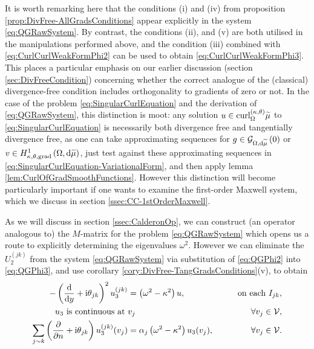 It is worth remarking here that the conditions (i) and (iv) from proposition \ref{prop:DivFree-AllGradsConditions} appear explicitly in the system \eqref{eq:QGRawSystem}.
By contrast, the conditions (ii), and (v) are both utilised in the manipulations performed above, and the condition (iii) combined with \eqref{eq:CurlCurlWeakFormPhi2} can be used to obtain \eqref{eq:CurlCurlWeakFormPhi3}.
This places a particular emphasis on our earlier discussion (section \ref{sec:DivFreeCondition}) concerning whether the correct analogue of the (classical) divergence-free condition includes orthogonality to gradients of zero or not.
In the case of the problem \eqref{eq:SingularCurlEquation} and the derivation of \eqref{eq:QGRawSystem}, this distinction is moot: any solution $u\in\mathrm{curl}_{\Omega}^{\left( \kappa, \theta \right)}{\widetilde{\mu}}$ to \eqref{eq:SingularCurlEquation} is necessarily both divergence free and tangentially divergence free, as one can take approximating sequences for $g\in\mathcal{G}_{ \Omega, \mathrm{d}\widetilde{\mu}}\left( 0 \right)$ or $v\in H^1_{\kappa,\theta,\mathrm{grad}}\left( \Omega, \mathrm{d}\widetilde{\mu} \right)$, just test against these approximating sequences in \eqref{eq:SingularCurlEquation-VariationalForm}, and then apply lemma \ref{lem:CurlOfGradSmoothFunctions}.
However this distinction will become particularly important if one wants to examine the first-order Maxwell system, which we discuss in section \ref{ssec:CC-1stOrderMaxwell}.

As we will discuss in section \ref{ssec:CalderonOp}, we can construct (an operator analogous to) the $M$-matrix for the problem \eqref{eq:QGRawSystem} which opens us a route to explicitly determining the eigenvalues $\omega^2$.
However we can eliminate the $U_2^{(jk)}$ from the system \eqref{eq:QGRawSystem} via substitution of \eqref{eq:QGPhi2} into \eqref{eq:QGPhi3}, and use corollary \ref{cory:DivFree-TangGradsConditions}(v), to obtain
\begin{subequations} \label{eq:CurlCurl-ScalarQGProblem}
	\begin{align}
		-\left(  \dfrac{\mathrm{d}}{\mathrm{d}y} + \mathrm{i}\theta_{jk}  \right)^2 u_3^{(jk)} &= \left( \omega^2-\kappa^2 \right)u,
		\qquad &\text{on each } I_{jk}, \\
		u_3 \text{ is continuous at } & v_j \qquad &\forall v_j\in\mathcal{V}, \\
		\sum_{j\sim k}\left( \dfrac{\partial }{\partial n}+\mathrm{i}\theta_{jk} \right)u_3^{(jk)}(v_j) &= \alpha_j\left( \omega^2-\kappa^2 \right)u_3(v_j), \qquad &\forall v_j\in\mathcal{V}.
	\end{align}
\end{subequations}

